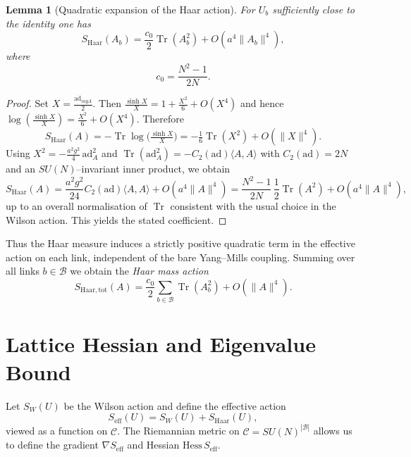 \documentclass[11pt]{article}
\newtheorem{lemma}[theorem]{Lemma}
\begin{document}
\begin{lemma}[Quadratic expansion of the Haar action]
For $U_b$ sufficiently close to the identity one has
\begin{equation}
  S_{\mathrm{Haar}}(A_b)
  = \frac{c_0}{2}\operatorname{Tr}(A_b^2) + O(a^4\|A_b\|^4),
\end{equation}
where
\begin{equation}
  c_0 = \frac{N^2-1}{2N}.
\end{equation}
\end{lemma}

\begin{proof}
Set $X = \tfrac{\mathrm{ad}_{iagA}}{2}$. Then
$\tfrac{\sinh X}{X} = 1 + \tfrac{X^2}{6} + O(X^4)$ and hence
$\log(\tfrac{\sinh X}{X}) = \tfrac{X^2}{6} + O(X^4)$. Therefore
\begin{equation}
  S_{\mathrm{Haar}}(A)
  = -\operatorname{Tr}\log\Big(\tfrac{\sinh X}{X}\Big)
  = -\tfrac{1}{6}\operatorname{Tr}(X^2) + O(\|X\|^4).
\end{equation}
Using $X^2 = -\tfrac{a^2g^2}{4}\,\mathrm{ad}_A^2$ and
$\operatorname{Tr}(\mathrm{ad}_A^2) = -C_2(\mathrm{ad})\langle A,A\rangle$
with $C_2(\mathrm{ad}) = 2N$ and an $SU(N)$--invariant inner product,
we obtain
\begin{equation}
  S_{\mathrm{Haar}}(A)
  = \frac{a^2g^2}{24}C_2(\mathrm{ad})\langle A,A\rangle
    + O(a^4\|A\|^4)
  = \frac{N^2-1}{2N}\,\frac{1}{2}\operatorname{Tr}(A^2) + O(a^4\|A\|^4),
\end{equation}
up to an overall normalisation of $\operatorname{Tr}$ consistent with the
usual choice in the Wilson action. This yields the stated coefficient.
\end{proof}

Thus the Haar measure induces a strictly positive quadratic term in the
effective action on each link, independent of the bare Yang--Mills
coupling. Summing over all links $b\in\mathcal{B}$ we obtain the
\emph{Haar mass action}
\begin{equation}
  S_{\mathrm{Haar,tot}}(A)
  = \frac{c_0}{2}\sum_{b\in\mathcal{B}}\operatorname{Tr}(A_b^2)
    + O(\|A\|^4).
\end{equation}

\section{Lattice Hessian and Eigenvalue Bound}

Let $S_W(U)$ be the Wilson action and define the effective action
\begin{equation}
  S_{\mathrm{eff}}(U) = S_W(U) + S_{\mathrm{Haar}}(U),
\end{equation}
viewed as a function on $\mathcal{C}$. The Riemannian metric on
$\mathcal{C} = SU(N)^{|\mathcal{B}|}$ allows us to define the gradient
$\nabla S_{\mathrm{eff}}$ and Hessian $\mathrm{Hess}\,S_{\mathrm{eff}}$.
\end{document}
